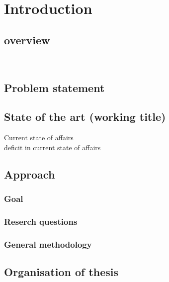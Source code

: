 \chapter{Introduction}
\section{overview} \\
\section{Problem statement}
\section{State of the art (working title)}
Current state of affairs \\
deficit in current state of affairs
\section{Approach}
\subsection{Goal}
\subsection{Reserch questions}
\subsection{General methodology}
\section{Organisation of thesis}
